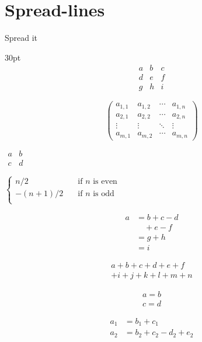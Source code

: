 \documentclass{article}
\begin{document}
\section{Spread-lines}
Spread it
\begin{spreadlines}{30pt}
  \[
  \begin{matrix}
   a & b & c \\
   d & e & f \\
   g & h & i
  \end{matrix}
  \]

  \[
  \begin{pmatrix}
   a_{1,1} & a_{1,2} & \cdots & a_{1,n} \\
   a_{2,1} & a_{2,2} & \cdots & a_{2,n} \\
   \vdots  & \vdots  & \ddots & \vdots  \\
   a_{m,1} & a_{m,2} & \cdots & a_{m,n}
  \end{pmatrix}
  \]

  $\begin{smallmatrix} a&b \\ c&d \end{smallmatrix}$

  $\begin{cases} n/2 & \quad \text{if } n \text{ is even}\\ -(n+1)/2 & \quad \text{if } n \text{ is odd}\\ \end{cases}$

  \begin{equation}\label{xx}
  \begin{split}
  a& =b+c-d\\
  & \quad +e-f\\
  & =g+h\\
  & =i
  \end{split}
  \end{equation}

  \begin{multline}
  a+b+c+d+e+f\\
  +i+j+k+l+m+n
  \end{multline}

  \begin{gather}
  a=b\\
  c=d
  \end{gather}

  \begin{align}
  a_1& =b_1+c_1\\
  a_2& =b_2+c_2-d_2+e_2
  \end{align}


\end{spreadlines}
\end{document}
